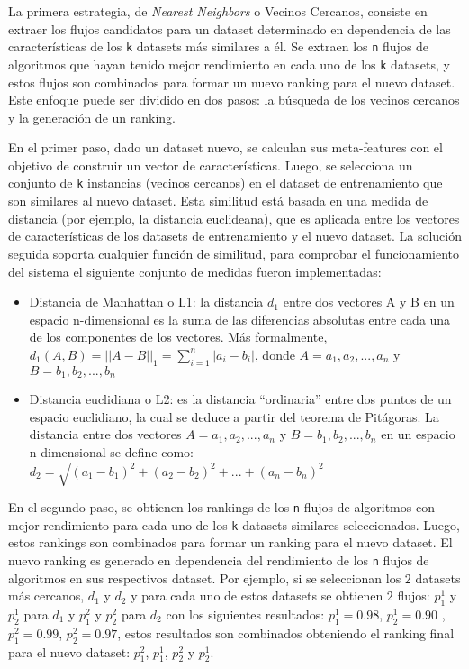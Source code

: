 La primera estrategia, de \textit{Nearest Neighbors} o Vecinos Cercanos, consiste en extraer los flujos candidatos para un dataset determinado en dependencia de las características de los \texttt{k} datasets más similares a él. Se extraen los \texttt{n} flujos de algoritmos que hayan tenido mejor rendimiento en cada uno de los \texttt{k} datasets, y estos flujos son combinados para formar un nuevo ranking para el nuevo dataset. Este enfoque puede ser dividido en dos pasos: la búsqueda de los vecinos cercanos y la generación de un ranking.

En el primer paso, dado un dataset nuevo, se calculan sus meta-features con el objetivo de construir un vector de características. Luego, se selecciona un conjunto de \texttt{k} instancias (vecinos cercanos) en el dataset de entrenamiento que son similares al nuevo dataset. Esta similitud está basada en una medida de distancia (por ejemplo, la distancia euclideana), que es aplicada entre los vectores de características de los datasets de entrenamiento y el nuevo dataset. La solución seguida soporta cualquier función de similitud, para comprobar el funcionamiento del sistema el siguiente conjunto de medidas fueron implementadas:

\begin{itemize}
	\item Distancia de Manhattan o L1: la distancia $d_1$ entre dos vectores A y B en un espacio n-dimensional es la suma de las diferencias absolutas entre cada una de los componentes de los vectores. Más formalmente, $d_1(A, B) = {||A - B||}_1 = \sum^n_{i=1} |a_i - b_i|$, donde $A = a_1, a_2, ..., a_n$ y $B = b_1, b_2, ..., b_n$
	\item Distancia euclidiana o L2: es la distancia ``ordinaria'' entre dos puntos de un espacio euclidiano, la cual se deduce a partir del teorema de Pitágoras. La distancia entre dos vectores $A = a_1, a_2, ..., a_n$ y $B = b_1, b_2, ..., b_n$ en un espacio n-dimensional se define como: $d_2 = \sqrt{(a_1 - b_1)^2 + (a_2 - b_2)^2 + ... + (a_n - b_n)^2}$
\end{itemize}

En el segundo paso, se obtienen los rankings de los \texttt{n} flujos de algoritmos con mejor rendimiento para cada uno de los \texttt{k} datasets similares seleccionados. Luego, estos rankings son combinados para formar un ranking para el nuevo dataset. El nuevo ranking es generado en dependencia del rendimiento de los \texttt{n} flujos de algoritmos en sus respectivos dataset. Por ejemplo, si se seleccionan los $2$ datasets más cercanos, $d_1$ y $d_2$ y para cada uno de estos datasets se obtienen $2$ flujos: $p^1_1$ y $p^1_2$ para $d_1$ y $p^2_1$ y $p^2_2$ para $d_2$ con los siguientes resultados: $p^1_1 = 0.98$, $p^1_2 = 0.90$ , $p^2_1 = 0.99$, $p^2_2 = 0.97$, estos resultados son combinados obteniendo el ranking final para el nuevo dataset: $p^2_1$, $p^1_1$, $p^2_2$ y $p^1_2$.

